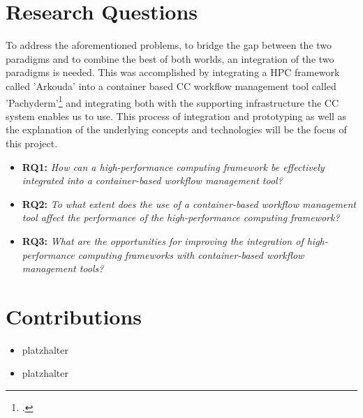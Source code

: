 \section{Research Questions}

To address the aforementioned problems, to bridge the gap between the two paradigms and to combine the best of both worlds, an integration of the two paradigms is needed.
This was accomplished by integrating a \ac{HPC} framework called 'Arkouda' into a container based \ac{CC} workflow management tool called 'Pachyderm'\footcite{pachydermPachyderm} and integrating both with the supporting infrastructure the \ac{CC} system enables us to use.
This process of integration and prototyping as well as the explanation of the underlying concepts and technologies will be the focus of this project.

\begin{itemize}
    \item \textbf{RQ1:} \textit{How can a high-performance computing framework be effectively integrated into a container-based workflow management tool?}
    \item \textbf{RQ2:} \textit{To what extent does the use of a container-based workflow management tool affect the performance of the high-performance computing framework?}
    \item \textbf{RQ3:} \textit{What are the opportunities for improving the integration of high-performance computing frameworks with container-based workflow management tools?}
\end{itemize}

\section{Contributions}

\begin{itemize}
    \item platzhalter   
    \item platzhalter   
\end{itemize}